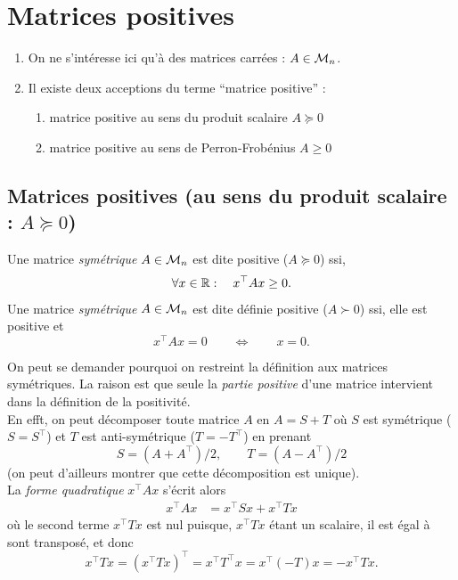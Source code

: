 \section{Matrices positives} \label{sec:LinAlg-Pos}

\remarks 
\begin{enumerate}
  \item On ne s'intéresse ici qu'à des matrices carrées : $A \in \mathcal{M}_n$.
  \item Il existe deux acceptions du terme ``matrice positive'' :
  \begin{enumerate}[$\bullet$]
    \item matrice positive au sens du produit scalaire $A \succcurlyeq 0$
    \item matrice positive au sens de Perron-Frobénius $A \geq 0$
  \end{enumerate}
\end{enumerate}


\subsection{Matrices positives (au sens du produit scalaire : $A \succcurlyeq 0$)} 

\begin{definition} \label{def:matricePositive}
  Une matrice {\em symétrique} $A \in \mathcal{M}_n$ est dite positive ($A \succcurlyeq 0$) ssi, 
  $$
  \forall x \in \mathbb{R}: \quad x^\top A x \geq 0.
  $$
  Une matrice {\em symétrique} $A \in \mathcal{M}_n$ est dite définie positive ($A \succ 0$) ssi, elle est positive et 
  $$
  x^\top A x = 0 \qquad \Leftrightarrow \qquad x = 0.
  $$
\end{definition}

\remark
On peut se demander pourquoi on restreint la définition aux matrices symétriques. La raison est que seule la {\em partie positive} d'une matrice intervient dans la définition de la positivité. \\
En efft, on peut décomposer toute matrice $A$  en $A = S + T$ où $S$ est symétrique ($S = S^\top$) et $T$ est anti-symétrique ($T = -T^\top$) en prenant
$$
S = (A + A^\top) / 2, \qquad T = (A - A^\top) / 2
$$
(on peut d'ailleurs montrer que cette décomposition est unique). \\
La {\em forme quadratique} $x^\top A x$ s'écrit alors
\begin{align*}
  x^\top A x 
  & = x^\top S x + x^\top T x 
\end{align*}
où le second terme $x^\top T x$ est nul puisque, $x^\top T x$ étant un scalaire, il est égal à sont transposé, et donc
$$
x^\top T x = (x^\top T x)^\top = x^\top T^\top x = x^\top (- T) x = - x^\top T x.
$$

